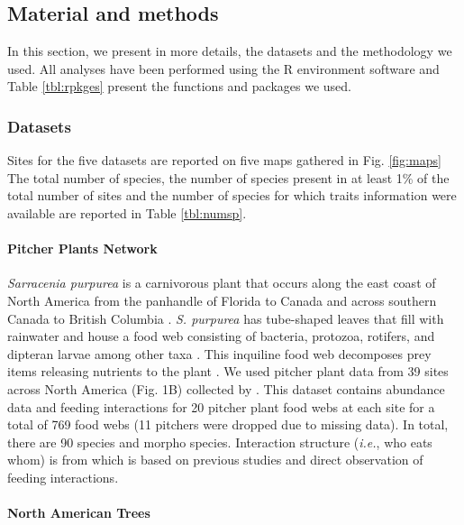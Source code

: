 \label{chap3si}

\subsection{Material and methods}\label{material-and-methods-1}

In this section, we present in more details, the datasets and the
methodology we used. All analyses have been performed using the R
environment software and Table \ref{tbl:rpkges} present the functions
and packages we used.

\subsubsection{Datasets}\label{datasets-1}

Sites for the five datasets are reported on five maps gathered in Fig.
\ref{fig:maps} The total number of species, the number of species
present in at least 1\% of the total number of sites and the number of
species for which traits information were available are reported in
Table \ref{tbl:numsp}.

\paragraph{Pitcher Plants Network}\label{pitcher-plants-network}

\emph{Sarracenia purpurea} is a carnivorous plant that occurs along the
east coast of North America from the panhandle of Florida to Canada and
across southern Canada to British Columbia \citep{Buckley2010}. \emph{S.
purpurea} has tube-shaped leaves that fill with rainwater and house a
food web consisting of bacteria, protozoa, rotifers, and dipteran larvae
among other taxa \citep{Addicott1974, Buckley2010}. This inquiline food
web decomposes prey items releasing nutrients to the plant
\citep{Mouquet2008, Baiser2011}. We used pitcher plant data from 39
sites across North America (Fig. 1B) collected by \citet{Buckley2010}.
This dataset contains abundance data and feeding interactions for 20
pitcher plant food webs at each site for a total of 769 food webs (11
pitchers were dropped due to missing data). In total, there are 90
species and morpho species. Interaction structure (\emph{i.e.}, who eats
whom) is from \citet{Baiser2012} which is based on previous studies
\citep[\emph{e.g.},][\citet{Butler2008}]{Addicott1974, Miller2002} and
direct observation of feeding interactions.

\paragraph{North American Trees}\label{north-american-trees}

